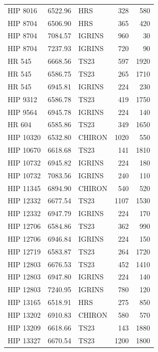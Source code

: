 \begin{scriptsize}
\begin{longtable}{|l|rlrr|}
    HIP 8016 &  6522.96 &        HRS &      328 &   580 \\
    HIP 8704 &  6506.90 &        HRS &      365 &   420 \\
    HIP 8704 &  7084.57 &     IGRINS &      960 &    30 \\
    HIP 8704 &  7237.93 &     IGRINS &      720 &    90 \\
      HR 545 &  6668.56 &       TS23 &      597 &  1920 \\
      HR 545 &  6586.75 &       TS23 &      265 &  1710 \\
      HR 545 &  6945.81 &     IGRINS &      224 &   230 \\
    HIP 9312 &  6586.78 &       TS23 &      419 &  1750 \\
    HIP 9564 &  6945.78 &     IGRINS &      224 &   140 \\
      HR 604 &  6585.86 &       TS23 &      349 &  1650 \\
   HIP 10320 &  6532.80 &     CHIRON &     1020 &   550 \\
   HIP 10670 &  6618.68 &       TS23 &      141 &  1810 \\
   HIP 10732 &  6945.82 &     IGRINS &      224 &   180 \\
   HIP 10732 &  7083.56 &     IGRINS &      240 &   110 \\
   HIP 11345 &  6894.90 &     CHIRON &      540 &   520 \\
   HIP 12332 &  6677.54 &       TS23 &     1107 &  1530 \\
   HIP 12332 &  6947.79 &     IGRINS &      224 &   170 \\
   HIP 12706 &  6584.86 &       TS23 &      362 &   990 \\
   HIP 12706 &  6946.84 &     IGRINS &      224 &   150 \\
   HIP 12719 &  6583.87 &       TS23 &      264 &  1720 \\
   HIP 12803 &  6676.53 &       TS23 &      452 &  1410 \\
   HIP 12803 &  6947.80 &     IGRINS &      224 &   140 \\
   HIP 12803 &  7240.95 &     IGRINS &      780 &   120 \\
   HIP 13165 &  6518.91 &        HRS &      275 &   850 \\
   HIP 13202 &  6910.83 &     CHIRON &      580 &   570 \\
   HIP 13209 &  6618.66 &       TS23 &      143 &  1880 \\
   HIP 13327 &  6670.54 &       TS23 &     1200 &  1800 \\

\end{longtable}
\end{scriptsize}
